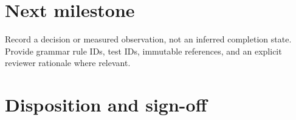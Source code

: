\documentclass[11pt,letterpaper]{article}
\begin{document}
\section{Next milestone}
Record a decision or measured observation, not an inferred completion state. Provide grammar rule IDs, test IDs, immutable references, and an explicit reviewer rationale where relevant.
\section{Disposition and sign-off}
\end{document}
